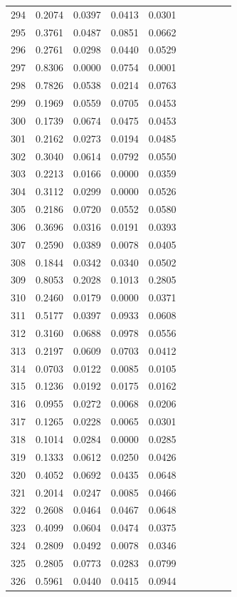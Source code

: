 \begin{table}
\begin{tabular}{cccccccccc}
294& 0.2074& 0.0397& 0.0413& 0.0301\\ 
295& 0.3761& 0.0487& 0.0851& 0.0662\\ 
296& 0.2761& 0.0298& 0.0440& 0.0529\\ 
297& 0.8306& 0.0000& 0.0754& 0.0001\\ 
298& 0.7826& 0.0538& 0.0214& 0.0763\\ 
299& 0.1969& 0.0559& 0.0705& 0.0453\\ 
300& 0.1739& 0.0674& 0.0475& 0.0453\\ 
301& 0.2162& 0.0273& 0.0194& 0.0485\\ 
302& 0.3040& 0.0614& 0.0792& 0.0550\\ 
303& 0.2213& 0.0166& 0.0000& 0.0359\\ 
304& 0.3112& 0.0299& 0.0000& 0.0526\\ 
305& 0.2186& 0.0720& 0.0552& 0.0580\\ 
306& 0.3696& 0.0316& 0.0191& 0.0393\\ 
307& 0.2590& 0.0389& 0.0078& 0.0405\\ 
308& 0.1844& 0.0342& 0.0340& 0.0502\\ 
309& 0.8053& 0.2028& 0.1013& 0.2805\\ 
310& 0.2460& 0.0179& 0.0000& 0.0371\\ 
311& 0.5177& 0.0397& 0.0933& 0.0608\\ 
312& 0.3160& 0.0688& 0.0978& 0.0556\\ 
313& 0.2197& 0.0609& 0.0703& 0.0412\\ 
314& 0.0703& 0.0122& 0.0085& 0.0105\\ 
315& 0.1236& 0.0192& 0.0175& 0.0162\\ 
316& 0.0955& 0.0272& 0.0068& 0.0206\\ 
317& 0.1265& 0.0228& 0.0065& 0.0301\\ 
318& 0.1014& 0.0284& 0.0000& 0.0285\\ 
319& 0.1333& 0.0612& 0.0250& 0.0426\\ 
320& 0.4052& 0.0692& 0.0435& 0.0648\\ 
321& 0.2014& 0.0247& 0.0085& 0.0466\\ 
322& 0.2608& 0.0464& 0.0467& 0.0648\\ 
323& 0.4099& 0.0604& 0.0474& 0.0375\\ 
324& 0.2809& 0.0492& 0.0078& 0.0346\\ 
325& 0.2805& 0.0773& 0.0283& 0.0799\\ 
326& 0.5961& 0.0440& 0.0415& 0.0944\\ 

\end{tabular}
\end{table}
